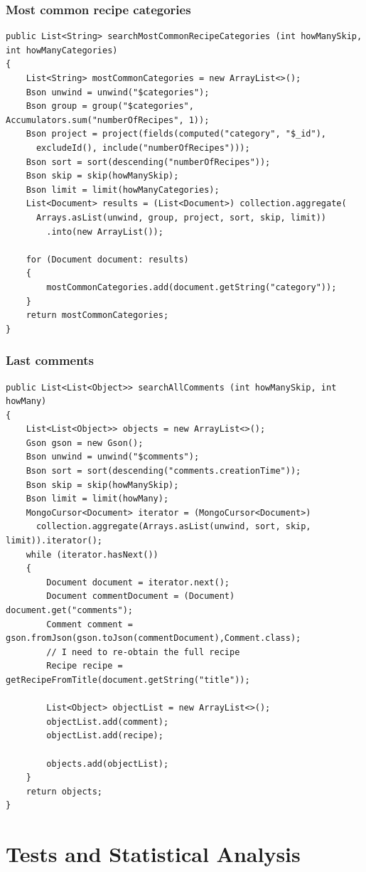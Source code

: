 \documentclass[a4paper]{report}
\begin{document}
\subsubsection{Most common recipe categories}
\lstset{language=code}
\begin{lstlisting}
public List<String> searchMostCommonRecipeCategories (int howManySkip, int howManyCategories)
{
    List<String> mostCommonCategories = new ArrayList<>();
    Bson unwind = unwind("$categories");
    Bson group = group("$categories", Accumulators.sum("numberOfRecipes", 1));
    Bson project = project(fields(computed("category", "$_id"), 
      excludeId(), include("numberOfRecipes")));
    Bson sort = sort(descending("numberOfRecipes"));
    Bson skip = skip(howManySkip);
    Bson limit = limit(howManyCategories);
    List<Document> results = (List<Document>) collection.aggregate(
      Arrays.asList(unwind, group, project, sort, skip, limit))
        .into(new ArrayList());

    for (Document document: results)
    {
        mostCommonCategories.add(document.getString("category"));
    }
    return mostCommonCategories;
}	
\end{lstlisting} 
\subsubsection{Last comments}
\lstset{language=code}
\begin{lstlisting}
public List<List<Object>> searchAllComments (int howManySkip, int howMany)
{
	List<List<Object>> objects = new ArrayList<>();
	Gson gson = new Gson();
	Bson unwind = unwind("$comments");
	Bson sort = sort(descending("comments.creationTime"));
	Bson skip = skip(howManySkip);
	Bson limit = limit(howMany);
	MongoCursor<Document> iterator = (MongoCursor<Document>)
	  collection.aggregate(Arrays.asList(unwind, sort, skip, limit)).iterator();
	while (iterator.hasNext())
	{
		Document document = iterator.next();
		Document commentDocument = (Document) document.get("comments");
		Comment comment = gson.fromJson(gson.toJson(commentDocument),Comment.class);
		// I need to re-obtain the full recipe
		Recipe recipe = getRecipeFromTitle(document.getString("title"));

		List<Object> objectList = new ArrayList<>();
		objectList.add(comment);
		objectList.add(recipe);

		objects.add(objectList);
	}
	return objects;
}
\end{lstlisting} 

\section{Tests and Statistical Analysis}
\end{document}
